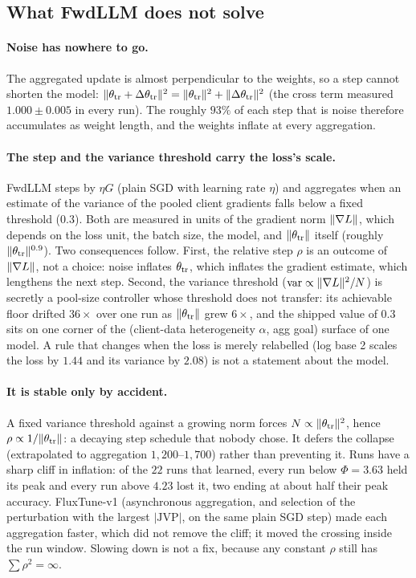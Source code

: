 \subsection{What FwdLLM does not solve}
\label{sec:ft:gaps}

\paragraph{Noise has nowhere to go.}
The aggregated update is almost perpendicular to the weights, so a step cannot shorten the model:
$\lVert \theta_{\mathrm{tr}}+\Delta\theta_{\mathrm{tr}}\rVert^2=\lVert \theta_{\mathrm{tr}}\rVert^2+\lVert \Delta\theta_{\mathrm{tr}}\rVert^2$ (the cross term measured $1.000\pm0.005$ in every run).
The roughly $93\%$ of each step that is noise therefore accumulates as weight length, and the weights inflate at every aggregation.

\paragraph{The step and the variance threshold carry the loss's scale.}
FwdLLM steps by $\eta G$ (plain SGD with learning rate $\eta$) and aggregates when an estimate of the variance of the pooled client gradients falls below a fixed threshold ($0.3$). Both are measured in units of the gradient norm $\lVert \nabla L\rVert$, which depends on
the loss unit, the batch size, the model, and $\lVert \theta_{\mathrm{tr}}\rVert$ itself (roughly $\lVert \theta_{\mathrm{tr}}\rVert^{0.9}$). Two consequences follow.
First, the relative step $\rho$ is an outcome of $\lVert \nabla L\rVert$, not a choice: noise inflates $\theta_{\mathrm{tr}}$, which inflates the gradient estimate, which lengthens the next step.
Second, the variance threshold ($\mathrm{var}\propto\lVert \nabla L\rVert^2/N$) is secretly a pool-size controller whose threshold does not transfer: its achievable floor drifted $36\times$ over one run
as $\lVert \theta_{\mathrm{tr}}\rVert$ grew $6\times$, and the shipped value of $0.3$ sits on one corner of the (client-data heterogeneity $\alpha$, agg goal) surface of one model.
A rule that changes when the loss is merely relabelled (log base 2 scales the loss by $1.44$ and its variance by $2.08$) is not a statement about the model.

\paragraph{It is stable only by accident.}
A fixed variance threshold against a growing norm forces $N\propto\lVert \theta_{\mathrm{tr}}\rVert^2$, hence $\rho\propto1/\lVert \theta_{\mathrm{tr}}\rVert$: a decaying step schedule that nobody chose.
It defers the collapse (extrapolated to aggregation $1{,}200$--$1{,}700$) rather than preventing it. Runs have a sharp cliff in inflation:
of the $22$ runs that learned, every run below $\Phi=3.63$ held its peak and every run above $4.23$ lost it, two ending at about half their peak accuracy.
FluxTune-v1 (asynchronous aggregation, and selection of the perturbation with the largest $|\text{JVP}|$, on the same plain SGD step) made each aggregation faster, which did not remove the cliff; it moved the crossing inside the run window.
Slowing down is not a fix, because any constant $\rho$ still has $\sum\rho^2=\infty$.

